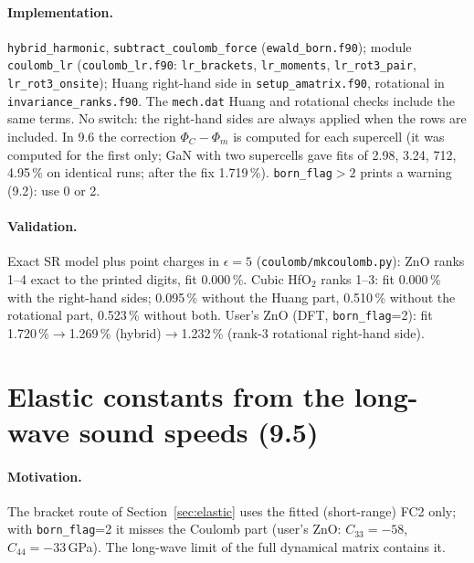 \documentclass[11pt,a4paper]{article}
\newcommand{\code}[1]{\texttt{#1}}
\begin{document}
\paragraph{Implementation.} \code{hybrid\_harmonic}, \code{subtract\_coulomb\_force} (\code{ewald\_born.f90});
module \code{coulomb\_lr} (\code{coulomb\_lr.f90}: \code{lr\_brackets}, \code{lr\_moments},
\code{lr\_rot3\_pair}, \code{lr\_rot3\_onsite}); Huang right-hand side in \code{setup\_amatrix.f90},
rotational in \code{invariance\_ranks.f90}. The \code{mech.dat} Huang and rotational checks include the
same terms. No switch: the right-hand sides are always applied when the rows are included. In 9.6 the
correction $\Phi_C-\Phi_m$ is computed for each supercell (it was computed for the first only; GaN with two
supercells gave fits of 2.98, 3.24, 712, 4.95\,\% on identical runs; after the fix 1.719\,\%).
\code{born\_flag}$>2$ prints a warning (9.2): use 0 or 2.

\paragraph{Validation.} Exact SR model plus point charges in $\epsilon=5$ (\code{coulomb/mkcoulomb.py}):
ZnO ranks 1--4 exact to the printed digits, fit 0.000\,\%. Cubic HfO$_2$ ranks 1--3: fit 0.000\,\% with the
right-hand sides; 0.095\,\% without the Huang part, 0.510\,\% without the rotational part, 0.523\,\% without
both. User's ZnO (DFT, \code{born\_flag}=2): fit 1.720\,\%$\to$1.269\,\% (hybrid)$\to$1.232\,\% (rank-3 rotational
right-hand side).

\section{Elastic constants from the long-wave sound speeds (9.5)}\label{sec:longwave}
\paragraph{Motivation.} The bracket route of Section~\ref{sec:elastic} uses the fitted (short-range) FC2
only; with \code{born\_flag}=2 it misses the Coulomb part (user's ZnO: $C_{33}=-58$, $C_{44}=-33$\,GPa). The
long-wave limit of the full dynamical matrix contains it.
\end{document}
